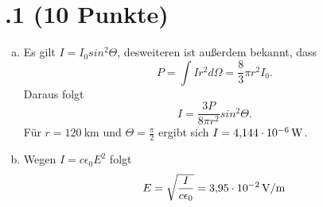 \section*{\nr.1 \titone (10 Punkte)}
\begin{enumerate}[(a)]
\item Es gilt $I = I_0 sin^2 \Theta$, desweiteren ist außerdem bekannt, dass
\begin{equation}
	P = \int I r^2d\Omega = \frac{8}{3} \pi r^2 I_0.
\end{equation}
Daraus folgt
\begin{equation}
	I = \frac{3 P}{8 \pi r^2} sin^2 \Theta.
\end{equation}
Für $r = \SI{120}{\kilo \metre}$ und $\Theta = \frac{\pi}{2}$ ergibt sich $I = \SI{4,144E-6}{\watt}$.
\item Wegen $I = c\epsilon_0 E^2$ folgt
\begin{equation}
	E = \sqrt{\frac{I}{c \epsilon_0}} = \SI{3,95E-2}{\volt\per\metre}
\end{equation}
\end{enumerate}
